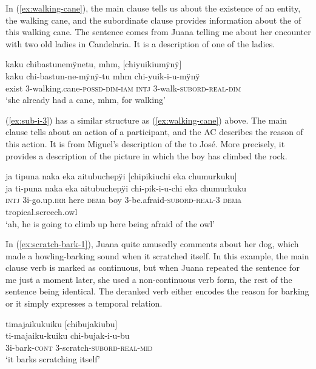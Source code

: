 
In (\ref{ex:walking-cane}), the main clause tells us about the existence of an entity, the walking cane, and the subordinate clause provides information about the  of this walking cane. The sentence comes from Juana telling me about her encounter with two old ladies in Candelaria. It is a description of one of the ladies.

\ea\label{ex:walking-cane}
\begingl
\glpreamble  kaku chibastunemÿnetu, mhm, \textup{[}chiyuikiumÿnÿ\textup{]}\\
\gla  kaku chi-bastun-ne-mÿnÿ-tu mhm chi-yuik-i-u-mÿnÿ\\
\glb exist 3-walking.cane-\textsc{possd}-\textsc{dim}-\textsc{iam} \textsc{intj} 3-walk-\textsc{subord}-\textsc{real}-\textsc{dim}\\
\glft ‘she already had a cane, mhm, for walking’
\endgl
\trailingcitation{[jxx-p120515l-1.220-221]}
\xe

(\ref{ex:sub-i-3}) has a similar structure as (\ref{ex:walking-cane}) above. The main clause tells about an action of a participant, and the AC describes the reason of this action. It is from Miguel’s description of the  to José. More precisely, it provides a description of the picture in which the boy has climbed the rock. 


\ea\label{ex:sub-i-3}
\begingl 
\glpreamble ja tipuna naka eka aitubuchepÿi \textup{[}chipikiuchi eka chumurkuku\textup{]}\\
\gla ja ti-puna naka eka aitubuchepÿi chi-pik-i-u-chi eka chumurkuku\\ 
\glb \textsc{intj} 3i-go.up.\textsc{irr} here \textsc{dem}a boy 3-be.afraid-\textsc{subord}-\textsc{real}-3 \textsc{dem}a tropical.screech.owl\\ 
\glft ‘ah, he is going to climb up here being afraid of the owl’
\trailingcitation{[mox-a110920l-2.120-122]}
\xe

In (\ref{ex:scratch-bark-1}), Juana quite amusedly comments about her dog, which made a howling-barking sound when it scratched itself. In this example, the main clause verb is marked as continuous, but when Juana repeated the sentence for me just a moment later, she used a non-continuous verb form, the rest of the sentence being identical. %
The deranked verb either encodes the reason for barking or it simply expresses a temporal relation.

\ea\label{ex:scratch-bark-1}
\begingl
\glpreamble timajaikukuiku \textup{[}chibujakiubu\textup{]}\\
\gla ti-majaiku-kuiku chi-bujak-i-u-bu\\
\glb 3i-bark-\textsc{cont} 3-scratch-\textsc{subord}-\textsc{real}-\textsc{mid}\\
\glft ‘it barks scratching itself’
\endgl
\trailingcitation{[jxx-p120430l-1.479]}
\xe


